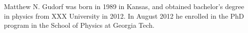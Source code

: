 
Matthew N. Gudorf was born in 1989 in Kansas, and obtained bachelor's degree
in physics from XXX University in 2012. In August 2012 he enrolled in
the PhD program in the School of Physics at Georgia Tech.
